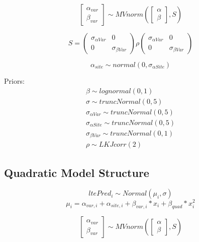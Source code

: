 \documentclass[11pt,letter]{article}
\begin{document}
\begin{equation*}
\begin{bmatrix}
\alpha_{var} \\
\beta_{var}
\end{bmatrix}
\sim MVnorm
\left(
\begin{bmatrix}
\alpha \\
\beta
\end{bmatrix}
,S
\right)
\end{equation*}

\begin{equation*}
S = 
\begin{pmatrix}
\sigma_{\alpha Var} & 0 \\
0 & \sigma_{\beta Var} 
\end{pmatrix}
\rho
\begin{pmatrix}
\sigma_{\alpha Var} & 0 \\
0 & \sigma_{\beta Var} 
\end{pmatrix}
\end{equation*}

\begin{equation*}
\alpha_{site} \sim normal(0, \sigma_{\alpha Site}) 
\end{equation*}

Priors:
\begin{gather*}
\beta \sim lognormal(0,1)\\
\sigma \sim truncNormal(0,5)\\
\sigma_{\alpha Var} \sim truncNormal(0,5)\\
\sigma_{\alpha Site} \sim truncNormal(0,5)\\
\sigma_{\beta Var} \sim truncNormal(0,1)\\
\rho \sim LKJcorr (2)
\end{gather*}


\subsection{Quadratic Model Structure}

\begin{equation*}
ltePred_{i} \sim Normal(\mu_{i}, \sigma ) 
\end{equation*}
\begin{equation*}
\mu_{i} = \alpha_{var,i} + \alpha_{site, i}+ \beta_{var, i}\ast x_{i} + \beta_{quad} \ast x^{2}_{i}
\end{equation*}

\begin{equation*}
\begin{bmatrix}
\alpha_{var} \\
\beta_{var}
\end{bmatrix}
\sim MVnorm
\left(
\begin{bmatrix}
\alpha \\
\beta
\end{bmatrix}
,S
\right)
\end{equation*}
\end{document}
